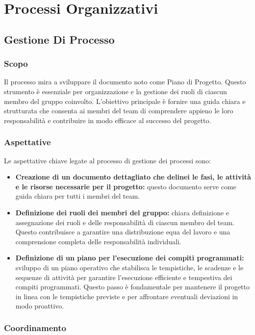 \documentclass{article}
\begin{document}
\section{Processi Organizzativi}
\subsection{Gestione Di Processo}

\subsubsection{Scopo}
Il processo mira a sviluppare il documento noto come Piano di Progetto. Questo strumento è essenziale per organizzazione e la gestione dei ruoli di ciascun membro del gruppo coinvolto. L'obiettivo principale è fornire una guida chiara e strutturata che consenta ai membri del team di comprendere appieno le loro responsabilità e contribuire in modo efficace al successo del progetto.

\subsubsection{Aspettative}
Le aspettative chiave legate al processo di gestione dei processi sono:
\begin{itemize}
    \item \textbf{Creazione di un documento dettagliato che delinei le fasi, le attività e le risorse necessarie per il progetto:} questo documento serve come guida chiara per tutti i membri del team.
    \item \textbf{Definizione dei ruoli dei membri del gruppo:} chiara definizione e assegnazione dei ruoli e delle responsabilità di ciascun membro del team. Questo contribuisce a garantire una distribuzione equa del lavoro e una comprensione completa delle responsabilità individuali.
    \item \textbf{Definizione di un piano per l'esecuzione dei compiti programmati:} sviluppo di un piano operativo che stabilisca le tempistiche, le scadenze e le sequenze di attività per garantire l'esecuzione efficiente e tempestiva dei compiti programmati. Questo passo è fondamentale per mantenere il progetto in linea con le tempistiche previste e per affrontare eventuali deviazioni in modo proattivo.
\end{itemize}



\subsubsection{Coordinamento}
\end{document}
